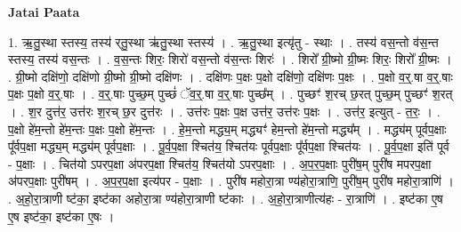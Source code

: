 \documentclass[17pt]{extarticle}
\begin{document}
\textbf{Jatai Paata} \newline

1. ऋ॒तु॒स्था स्तस्य॒ तस्य॑ र्‌तु॒स्था ऋ॑तु॒स्था स्तस्य॑ । . ऋ॒तु॒स्था इत्यृ॑तु - स्थाः । . तस्य॑ वस॒न्तो व॑स॒न्त स्तस्य॒ तस्य॑ वस॒न्तः । . व॒स॒न्तः शिरः॒ शिरो॑ वस॒न्तो व॑स॒न्तः शिरः॑ । . शिरो᳚ ग्री॒ष्मो ग्री॒ष्मः शिरः॒ शिरो᳚ ग्री॒ष्मः । . ग्री॒ष्मो दक्षि॑णो॒ दक्षि॑णो ग्री॒ष्मो ग्री॒ष्मो दक्षि॑णः । . दक्षि॑णः प॒क्षः प॒क्षो दक्षि॑णो॒ दक्षि॑णः प॒क्षः । . प॒क्षो व॒र्॒.षा व॒र्॒.षाः प॒क्षः प॒क्षो व॒र्॒.षाः । . व॒र्॒.षाः पुच्छ॒म् पुच्छं॑ ॅव॒र्॒.षा व॒र्॒.षाः पुच्छ᳚म् । . पुच्छꣳ॑ श॒रच् छ॒रत् पुच्छ॒म् पुच्छꣳ॑ श॒रत् । . श॒र दुत्त॑र॒ उत्त॑रः श॒रच् छ॒र दुत्त॑रः । . उत्त॑रः प॒क्षः प॒क्ष उत्त॑र॒ उत्त॑रः प॒क्षः । . उत्त॑र॒ इत्युत् - त॒रः॒ । . प॒क्षो हे॑म॒न्तो हे॑म॒न्तः प॒क्षः प॒क्षो हे॑म॒न्तः । . हे॒म॒न्तो मद्ध्य॒म् मद्ध्यꣳ॑ हेम॒न्तो हे॑म॒न्तो मद्ध्य᳚म् । . मद्ध्य॑म् पूर्वप॒क्षाः पू᳚र्वप॒क्षा मद्ध्य॒म् मद्ध्य॑म् पूर्वप॒क्षाः । . पू॒र्व॒प॒क्षा श्चित॑य॒ श्चित॑यः पूर्वप॒क्षाः पू᳚र्वप॒क्षा श्चित॑यः । . पू॒र्व॒प॒क्षा इति॑ पूर्व - प॒क्षाः । . चित॑यो ऽपरप॒क्षा अ॑परप॒क्षा श्चित॑य॒ श्चित॑यो ऽपरप॒क्षाः । . अ॒प॒र॒प॒क्षाः पुरी॑ष॒म् पुरी॑ष मपरप॒क्षा अ॑परप॒क्षाः पुरी॑षम् । . अ॒प॒र॒प॒क्षा इत्य॑पर - प॒क्षाः । . पुरी॑ष महोरा॒त्रा ण्य॑होरा॒त्राणि॒ पुरी॑ष॒म् पुरी॑ष महोरा॒त्राणि॑ । . अ॒हो॒रा॒त्राणी ष्ट॑का॒ इष्ट॑का अहोरा॒त्रा ण्य॑होरा॒त्राणी ष्ट॑काः । . अ॒हो॒रा॒त्राणीत्य॑हः - रा॒त्राणि॑ । . इष्ट॑का ए॒ष ए॒ष इष्ट॑का॒ इष्ट॑का ए॒षः । \newline
\end{document}

